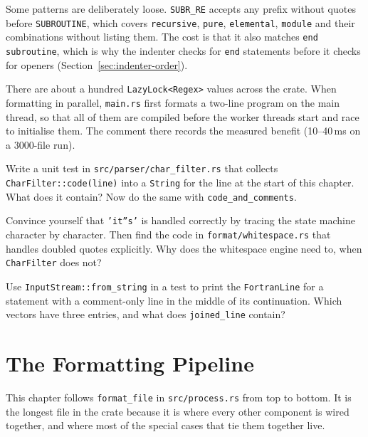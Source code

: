 \documentclass[11pt,a4paper,openany]{book}
\newcommand{\code}[1]{\texttt{\small #1}}
\newcommand{\file}[1]{\texttt{\small\color{accent}#1}}
\newcounter{exercise}[chapter]
\begin{document}
Some patterns are deliberately loose. \code{SUBR\_RE} accepts any prefix without
quotes before \code{SUBROUTINE}, which covers \code{recursive},
\code{pure}, \code{elemental}, \code{module} and their combinations without
listing them. The cost is that it also matches \code{end subroutine}, which
is why the indenter checks for \code{end} statements before it checks for
openers (Section~\ref{sec:indenter-order}).

\begin{keyidea}
There are about a hundred \code{LazyLock<Regex>} values across the crate. When
formatting in parallel, \file{main.rs} first formats a two-line program on the
main thread, so that all of them are compiled before the worker threads start
and race to initialise them. The comment there records the measured benefit
(10--40\,ms on a 3000-file run).
\end{keyidea}

\begin{exercise}
Write a unit test in \file{src/parser/char\_filter.rs} that collects
\code{CharFilter::code(line)} into a \code{String} for the line at the start of
this chapter. What does it contain? Now do the same with
\code{code\_and\_comments}.
\end{exercise}

\begin{exercise}
Convince yourself that \code{'it''s'} is handled correctly by tracing the
state machine character by character. Then find the code in
\file{format/whitespace.rs} that handles doubled quotes explicitly. Why does
the whitespace engine need to, when \code{CharFilter} does not?
\end{exercise}

\begin{exercise}
Use \code{InputStream::from\_string} in a test to print the
\code{FortranLine} for a statement with a comment-only line in the middle of
its continuation. Which vectors have three entries, and what does
\code{joined\_line} contain?
\end{exercise}
\chapter{The Formatting Pipeline}\label{ch:pipeline}

This chapter follows \code{format\_file} in \file{src/process.rs} from top to
bottom. It is the longest file in the crate because it is where every other
component is wired together, and where most of the special cases that tie them
together live.
\end{document}
